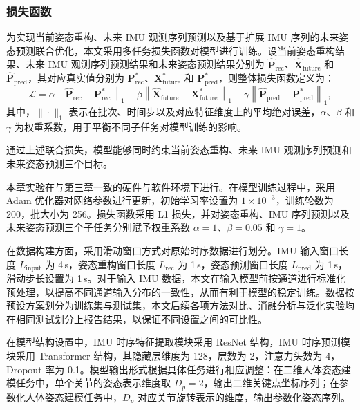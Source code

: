 \subsubsection{损失函数}{}

为实现当前姿态重构、未来 IMU 观测序列预测以及基于扩展 IMU 序列的未来姿态预测联合优化，本文采用多任务损失函数对模型进行训练。设当前姿态重构结果、未来 IMU 观测序列预测结果和未来姿态预测结果分别为 $\hat{\mathbf{P}}_{\mathrm{rec}}$、$\hat{\mathbf{X}}_{\mathrm{future}}$ 和 $\hat{\mathbf{P}}_{\mathrm{pred}}$，其对应真实值分别为 $\mathbf{P}_{\mathrm{rec}}^{\ast}$、$\mathbf{X}_{\mathrm{future}}^{\ast}$ 和 $\mathbf{P}_{\mathrm{pred}}^{\ast}$，则整体损失函数定义为：
\begin{equation}
\mathcal{L} = \alpha \left\| \hat{\mathbf{P}}_{\mathrm{rec}} - \mathbf{P}_{\mathrm{rec}}^{\ast} \right\|_{1}
+ \beta \left\| \hat{\mathbf{X}}_{\mathrm{future}} - \mathbf{X}_{\mathrm{future}}^{\ast} \right\|_{1}
+ \gamma \left\| \hat{\mathbf{P}}_{\mathrm{pred}} - \mathbf{P}_{\mathrm{pred}}^{\ast} \right\|_{1},
\label{eq:loss}
\end{equation}
其中，$\|\cdot\|_1$ 表示在批次、时间步以及对应特征维度上的平均绝对误差，$\alpha$、$\beta$ 和 $\gamma$ 为权重系数，用于平衡不同子任务对模型训练的影响。

通过上述联合损失，模型能够同时约束当前姿态重构、未来 IMU 观测序列预测和未来姿态预测三个目标。



本章实验在与第三章一致的硬件与软件环境下进行。在模型训练过程中，采用 Adam 优化器对网络参数进行更新，初始学习率设置为 $1\times10^{-3}$，训练轮数为 200，批大小为 256。损失函数采用 L1 损失，并对姿态重构、IMU 序列预测以及未来姿态预测三个子任务分别赋予权重系数 $\alpha=1$、$\beta=0.05$ 和 $\gamma=1$。

在数据构建方面，采用滑动窗口方式对原始时序数据进行划分。IMU 输入窗口长度 $L_{\mathrm{input}}$ 为 4\,s，姿态重构窗口长度 $L_{\mathrm{rec}}$ 为 1\,s，姿态预测窗口长度 $L_{\mathrm{pred}}$ 为 1\,s，滑动步长设置为 1\,s。对于输入 IMU 数据，本文在输入模型前按通道进行标准化预处理，以提高不同通道输入分布的一致性，从而有利于模型的稳定训练。数据按预设方案划分为训练集与测试集，本文后续各项方法对比、消融分析与泛化实验均在相同测试划分上报告结果，以保证不同设置之间的可比性。

在模型结构设置中，IMU 时序特征提取模块采用 ResNet 结构，IMU 时序预测模块采用 Transformer 结构，其隐藏层维度为 128，层数为 2，注意力头数为 4，Dropout 率为 0.1。模型输出形式根据具体任务进行相应调整：在二维人体姿态建模任务中，单个关节的姿态表示维度取 $D_p=2$，输出二维关键点坐标序列；在参数化人体姿态建模任务中，$D_p$ 对应关节旋转表示的维度，输出参数化姿态序列。

